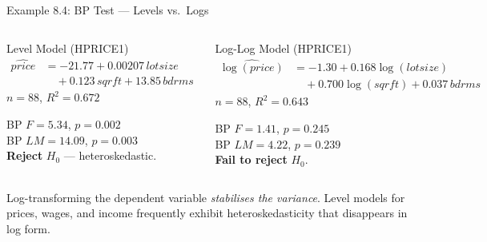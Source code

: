 \documentclass[aspectratio=169, 12pt]{beamer}
\begin{document}
\begin{frame}{Example 8.4: BP Test — Levels vs.\ Logs}

  \begin{columns}[t]
    \begin{examplebox}{Level Model (HPRICE1)}
      \begin{align*}
        \widehat{\textit{price}} &= -21.77 + 0.00207\,\textit{lotsize} \\
                                 &\quad + 0.123\,\textit{sqrft} + 13.85\,\textit{bdrms}
      \end{align*}
      $n=88$, $R^2=0.672$

      \smallskip
      BP $F = 5.34$, $p = 0.002$\\
      BP $LM = 14.09$, $p = 0.003$\\
      \smallskip
      \textcolor{negative}{\textbf{Reject} $H_0$} — heteroskedastic.
    \end{examplebox}

    \begin{examplebox}{Log-Log Model (HPRICE1)}
      \begin{align*}
        \widehat{\log(\textit{price})} &= -1.30 + 0.168\log(\textit{lotsize}) \\
                                       &\quad + 0.700\log(\textit{sqrft}) + 0.037\,\textit{bdrms}
      \end{align*}
      $n=88$, $R^2=0.643$

      \smallskip
      BP $F = 1.41$, $p = 0.245$\\
      BP $LM = 4.22$, $p = 0.239$\\
      \smallskip
      \textcolor{positive}{\textbf{Fail to reject}} $H_0$.
    \end{examplebox}
  \end{columns}

  \smallskip

  \begin{keybox}
    Log-transforming the dependent variable \textit{stabilises the variance}. Level models for prices, wages, and income frequently exhibit heteroskedasticity that disappears in log form.
  \end{keybox}

\end{frame}
\end{document}
